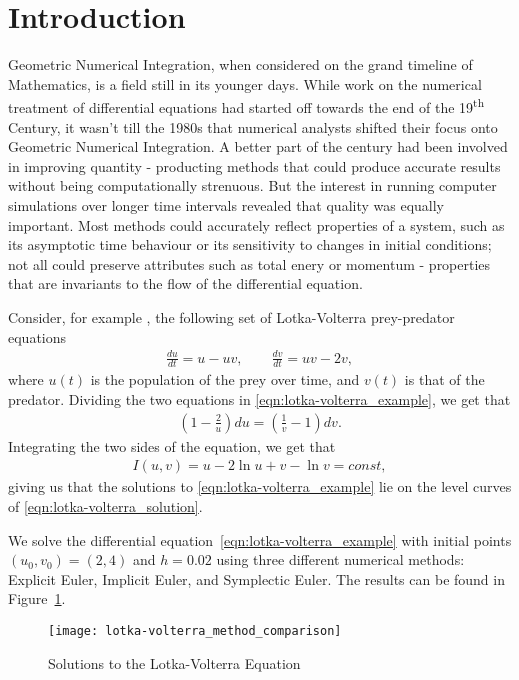 \documentclass[../Main.tex]{subfiles}
\begin{document}
\section{Introduction}

Geometric Numerical Integration, when considered on the grand timeline of Mathematics, is a field still in its younger days. While work on the numerical treatment of differential equations had started off towards the end of the 19\textsuperscript{th} Century, it wasn't till the 1980s that numerical analysts shifted their focus onto Geometric Numerical Integration.  A  better part of the century had been involved in improving quantity -  producting methods that could produce accurate results without being computationally strenuous. But the interest in running computer simulations over longer time intervals revealed that quality was equally important. Most methods could accurately reflect properties of a system, such as its asymptotic time behaviour or its sensitivity to changes in initial conditions; not all could preserve attributes such as total enery or momentum - properties that are invariants to the flow of the differential equation.

Consider, for example \cite{Hairer2006}, the following set of Lotka-Volterra prey-predator equations
\begin{align}
	\frac{du}{dt} = u - uv, \qquad \frac{dv}{dt} = uv - 2v, \label{eqn:lotka-volterra_example}
\end{align} where $u(t)$ is the population of the prey over time, and $v(t)$ is that of the predator. Dividing the two equations in \ref{eqn:lotka-volterra_example}, we get that
\begin{align*}
\left(1 -  \frac{2}{u}\right) du = \left(\frac{1}{v} - 1\right) dv.
\end{align*}
Integrating the two sides of the equation, we get that
\begin{align}
I(u, v) = u - 2\ln{u} +  v - \ln{v} = const, \label{eqn:lotka-volterra_solution}
\end{align}
giving us that the solutions to \ref{eqn:lotka-volterra_example} lie on the level curves of \ref{eqn:lotka-volterra_solution}.

We solve the differential equation~\ref{eqn:lotka-volterra_example} with initial points $(u_0, v_0) = (2, 4)$ and $h = 0.02$ using three different numerical methods: Explicit Euler, Implicit Euler, and Symplectic Euler. The results can be found in Figure~\ref{fig:lotka-volterra_solutions}. 
\begin{figure}[H]
\texttt{[image: lotka-volterra\_method\_comparison]}
\centering
\caption{Solutions to the Lotka-Volterra Equation}
\label{fig:lotka-volterra_solutions}
\end{figure}
\end{document}
